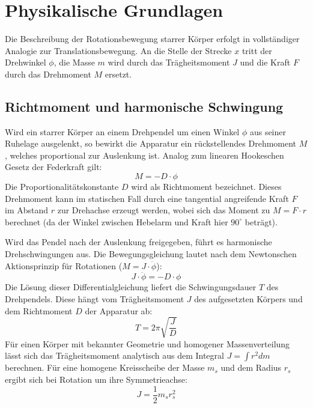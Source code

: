 \documentclass[12pt,a4paper,titlepage]{scrartcl}
\numberwithin{equation}{section}
\numberwithin{table}{section}
\numberwithin{figure}{section}
\begin{document}
\section{Physikalische Grundlagen}\label{sec:Physikalische Grundlagen}
Die Beschreibung der Rotationsbewegung starrer Körper erfolgt in vollständiger Analogie zur Translationsbewegung. An die Stelle der Strecke $x$ tritt der Drehwinkel $\phi$, die Masse $m$ wird durch das Trägheitsmoment $J$ und die Kraft $F$ durch das Drehmoment $M$ ersetzt. 

\bigskip
\subsection{Richtmoment und harmonische Schwingung}
Wird ein starrer Körper an einem Drehpendel um einen Winkel $\phi$ aus seiner Ruhelage ausgelenkt, so bewirkt die Apparatur ein rückstellendes Drehmoment $M$, welches proportional zur Auslenkung ist. Analog zum linearen Hookeschen Gesetz der Federkraft gilt:
\begin{equation}
    M = -D \cdot \phi
\end{equation}
Die Proportionalitätskonstante $D$ wird als Richtmoment bezeichnet. Dieses Drehmoment kann im statischen Fall durch eine tangential angreifende Kraft $F$ im Abstand $r$ zur Drehachse erzeugt werden, wobei sich das Moment zu $M = F \cdot r$ berechnet (da der Winkel zwischen Hebelarm und Kraft hier $90^\circ$ beträgt).

Wird das Pendel nach der Auslenkung freigegeben, führt es harmonische Drehschwingungen aus. Die Bewegungsgleichung lautet nach dem Newtonschen Aktionsprinzip für Rotationen ($M = J \cdot \ddot{\phi}$):
\begin{equation}
    J \cdot \ddot{\phi} = -D \cdot \phi
\end{equation}
Die Lösung dieser Differentialgleichung liefert die Schwingungsdauer $T$ des Drehpendels. Diese hängt vom Trägheitsmoment $J$ des aufgesetzten Körpers und dem Richtmoment $D$ der Apparatur ab:
\begin{equation}
    T = 2\pi \sqrt{\frac{J}{D}}\label{eq:periodendauer}
\end{equation}
Für einen Körper mit bekannter Geometrie und homogener Massenverteilung lässt sich das Trägheitsmoment analytisch aus dem Integral $J = \int r^2 dm$ berechnen. Für eine homogene Kreisscheibe der Masse $m_s$ und dem Radius $r_s$ ergibt sich bei Rotation um ihre Symmetrieachse:
\begin{equation}
    J = \frac{1}{2} m_s r_s^2
\end{equation}
\end{document}
